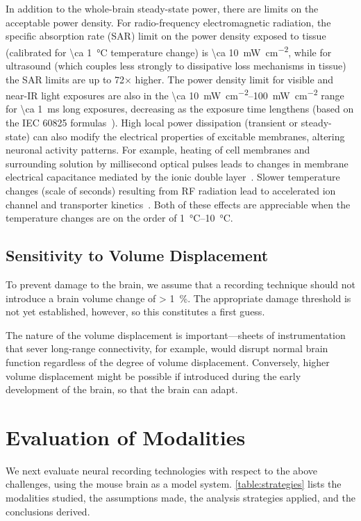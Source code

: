 In addition to the whole-brain steady-state power, there are limits on the acceptable power density.
For radio-frequency electromagnetic radiation, the specific absorption rate (SAR) limit on the power density exposed to tissue (calibrated for \SI{\ca 1}{\celsius} temperature change) is  \SI{\ca 10}{\milli\watt\per\centi\meter\squared}, while for ultrasound (which couples less strongly to dissipative loss mechanisms in tissue) the SAR limits are up to 72$\times$ higher.
The power density limit for visible and near-IR light exposures are also in the \SIrange{\ca 10}{100}{\milli\watt\per\centi\meter\squared} range for \SI{\ca 1}{\milli\second} long exposures, decreasing as the exposure time lengthens (based on the IEC 60825 formulas~\cite{iec60825}).
High local power dissipation (transient or steady-state) can also modify the electrical properties of excitable membranes, altering neuronal activity patterns.
For example, heating of cell membranes and surrounding solution by millisecond optical pulses leads to changes in membrane electrical capacitance mediated by the ionic double layer~\cite{shapiro12}.
Slower temperature changes (scale of seconds) resulting from RF radiation lead to accelerated ion channel and transporter kinetics~\cite{shapiro13}.
Both of these effects are appreciable when the temperature changes are on the order of \SIrange{1}{10}{\degreeCelsius}.

\subsection{Sensitivity to Volume Displacement}

To prevent damage to the brain, we assume that a recording technique should not introduce a brain volume change of \SI{> 1}{\percent}. The appropriate damage threshold is not yet established, however, so this constitutes a first guess.

The nature of the volume displacement is important---sheets of instrumentation that sever long-range connectivity, for example, would disrupt normal brain function regardless of the degree of volume displacement.
Conversely, higher volume displacement might be possible if introduced during the early development of the brain, so that the brain can adapt.

\section{Evaluation of Modalities}

We next evaluate neural recording technologies with respect to the above challenges, using the mouse brain as a model system.
\autoref{table:strategies} lists the modalities studied, the assumptions made, the analysis strategies applied, and the conclusions derived.

